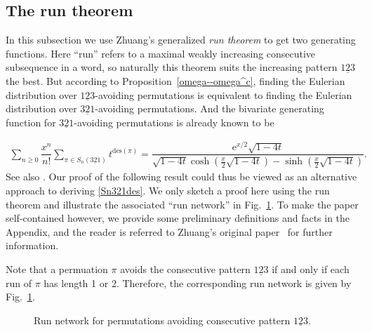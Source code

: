 \documentclass[11pt,reqno]{amsart}
\numberwithin{equation}{section}
\theoremstyle{plain}
\theoremstyle{definition}
\begin{document}
\subsection{The run theorem} \label{subsec:run theorem}


In this subsection we use Zhuang's generalized \emph{run theorem} \cite{zhu16} to get two generating functions. Here ``run'' refers to a maximal weakly increasing consecutive subsequence in a word, so naturally this theorem suits the increasing pattern $\underline{123}$ the best. But according to Proposition~\ref{omega--omega^c}, finding the Eulerian distribution over $\underline{123}$-avoiding permutations is equivalent to finding the Eulerian distribution over $\underline{321}$-avoiding permutations. And the bivariate generating function for $\underline{321}$-avoiding permutations is already known to be \cite{MR06}

\begin{align}\label{Sn321des}
	\sum_{n\geq 0}\dfrac{x^n}{n!}\sum_{\pi \in S_n(\underline{321})} t^{\mathrm{des}(\pi)}=\dfrac{\mathrm{e}^{x/2}\sqrt{1-4t}}{\sqrt{1-4t}\cosh {\left(\frac{x}{2}\sqrt{1-4t}\right)}-\sinh{\left(\frac{x}{2}\sqrt{1-4t}\right)}}.
\end{align}
See also \cite[Thm.~5.3.4]{kit11}. Our proof of the following result could thus be viewed as an alternative approach to deriving \eqref{Sn321des}. We only sketch a proof here using the run theorem and illustrate the associated ``run network'' in Fig.~\ref{sn123runnetwork}. To make the paper self-contained however, we provide some preliminary definitions and facts in the Appendix, and the reader is referred to Zhuang's original paper~\cite{zhu16} for further information.

Note that a permuation $\pi$ avoids the consecutive pattern $\underline{123}$ if and only if each run of $\pi$ has length 1 or 2. Therefore, the corresponding run network is given by Fig.~\ref{sn123runnetwork}.



\begin{figure}[htbp]	
	 \centering
\caption{Run network for permutations avoiding consecutive pattern $\underline{123}$.}
\label{sn123runnetwork}
\end{figure}
\end{document}
